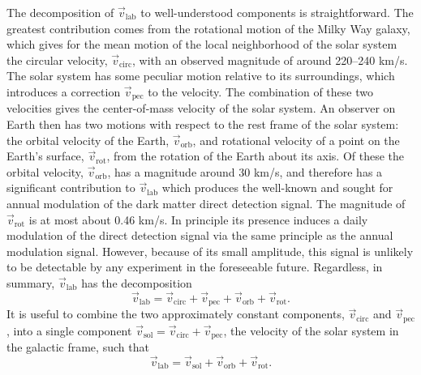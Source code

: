 The decomposition of $\vec{v}_\text{lab}$ to well-understood components is straightforward. The greatest contribution comes from the rotational motion of the Milky Way galaxy, which gives for the mean motion of the local neighborhood of the solar system the circular velocity, $\vec{v}_\text{circ}$, with an observed magnitude of around 220--240 km/s. The solar system has some peculiar motion relative to its surroundings, which introduces a correction $\vec{v}_\text{pec}$ to the velocity. The combination of these two velocities gives the center-of-mass velocity of the solar system. An observer on Earth then has two motions with respect to the rest frame of the solar system: the orbital velocity of the Earth, $\vec{v}_\text{orb}$, and rotational velocity of a point on the Earth's surface, $\vec{v}_\text{rot}$, from the rotation of the Earth about its axis. Of these the orbital velocity, $\vec{v}_\text{orb}$, has a magnitude around 30 km/s, and therefore has a significant contribution to $\vec{v}_\text{lab}$ which produces the well-known and sought for annual modulation of the dark matter direct detection signal. The magnitude of $\vec{v}_\text{rot}$ is at most about 0.46 km/s. In principle its presence induces a daily modulation of the direct detection signal via the same principle as the annual modulation signal. However, because of its small amplitude, this signal is unlikely to be detectable by any experiment in the foreseeable future. Regardless, in summary, $\vec{v}_\text{lab}$ has the decomposition
\begin{equation}
    \vec{v}_\text{lab}=\vec{v}_\text{circ}+\vec{v}_\text{pec}+\vec{v}_\text{orb}+\vec{v}_\text{rot}.
\end{equation}
It is useful to combine the two approximately constant components, $\vec{v}_\text{circ}$ and $\vec{v}_\text{pec}$, into a single component $\vec{v}_\text{sol}=\vec{v}_\text{circ}+\vec{v}_\text{pec}$, the velocity of the solar system in the galactic frame, such that
\begin{equation}
    \vec{v}_\text{lab}=\vec{v}_\text{sol}+\vec{v}_\text{orb}+\vec{v}_\text{rot}.
\end{equation}

